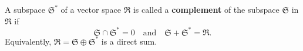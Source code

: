 A subspace $\mathfrak{S}^*$ of a vector space $\mathfrak{R}$ is called a \textbf{complement} of the subspace $\mathfrak{S}$ in $\mathfrak{R}$ if
$$
\mathfrak{S} \cap \mathfrak{S}^* = 0 \quad \text{and} \quad \mathfrak{S} + \mathfrak{S}^* = \mathfrak{R}.
$$
Equivalently, $\mathfrak{R} = \mathfrak{S} \oplus \mathfrak{S}^*$ is a direct sum.
